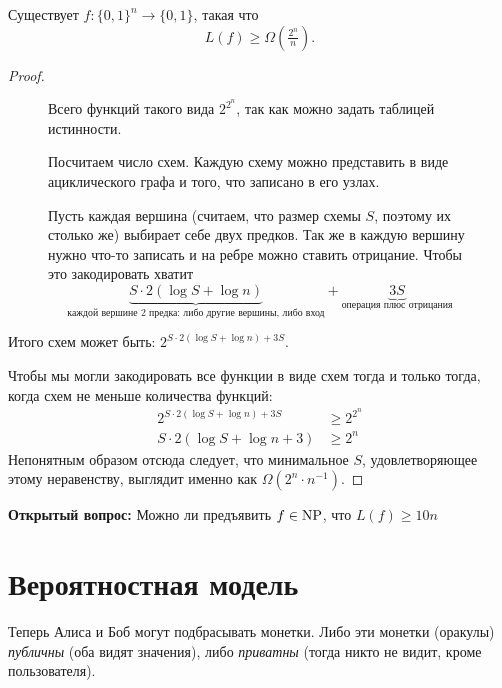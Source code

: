\begin{thm}[Шеннон]
	Существует $ f \colon \{0, 1\}^{n} \to  \{0, 1\}$, такая что 
	$$ L(f) \ge \Omega\left( \tfrac{2^{n}}{n} \right) .$$
\end{thm}
\begin{proof}
\begin{figure}[h]
	\begin{minipage}{0.7\textwidth}
    Всего функций такого вида $ 2^{2^{n}}$, так как можно задать таблицей истинности.

	Посчитаем число схем. Каждую схему можно представить в виде ациклического графа и того, что записано в его узлах.

	Пусть каждая вершина (считаем, что размер схемы $ S$, поэтому их столько же) выбирает себе двух предков. 
	Так же в каждую вершину нужно что-то записать и на ребре можно ставить отрицание. Чтобы это закодировать хватит 
	$$
	\underbrace{S \cdot 2 ( \log S + \log n)}_{\text{каждой вершине 2 предка: либо другие вершины, либо вход}} + \underbrace{3S}_{\text{операция плюс отрицания}}
	$$
	\end{minipage}
	\begin{minipage}{0.27\textwidth}
		\centering
		\label{fig:scheme-hard}
	\end{minipage}
\end{figure}

	Итого схем может быть: $2^{ S \cdot 2 (\log S + \log n) + 3S}$.

	Чтобы мы могли закодировать все функции в виде схем тогда и только тогда, когда 
	схем не меньше  количества функций:
	\begin{align*}
		2^{S \cdot  2( \log S + \log n) + 3S} &\ge  2^{2^n} \\
		S \cdot  2( \log S + \log n + 3)&\ge  2^n 
	\end{align*}
	Непонятным образом отсюда следует, что минимальное $ S$, удовлетворяющее этому неравенству, выглядит именно как $  \Omega (2^{n}\cdot n^{-1})$.
\end{proof}

\textbf{Открытый вопрос:} Можно ли предъявить $ f \in \operatorname{NP}$, что $ L(f) \ge  10n$




\section{Вероятностная модель}
Теперь Алиса и Боб могут подбрасывать монетки. Либо эти монетки (оракулы) \textit{публичны} (оба видят значения), либо \textit{приватны} (тогда никто не видит, кроме пользователя).

